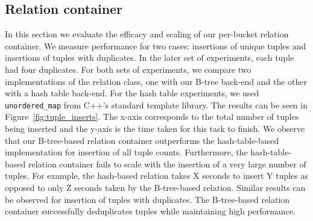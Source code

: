 

\subsection{Relation container}
\label{sec:relation}

In this section we evaluate the efficacy and scaling of our per-bucket relation container. We measure performance for two cases: insertions of unique tuples and insertions of tuples with duplicates. In the later set of experiments, each tuple had four duplicates. For both sets of experiments, we compare two implementations of the relation class, one with our B-tree back-end and the other with a hash table back-end. For the hash table experiments, we used \texttt{unordered\_map} from C++'s standard template library. The results can be seen in Figure~\ref{fig:tuple_inserts}. The x-axis corresponds to the total number of tuples being inserted and the y-axis is the time taken for this task to finish. We observe that our B-tree-based relation container outperforms the hash-table-based implementation for insertion of all tuple counts. Furthermore, the hash-table-based relation container fails to scale with the insertion of a very large number of tuples. For example, the hash-based relation takes X seconds to insert Y tuples as opposed to only Z seconds taken by the B-tree-based relation. Similar results can be observed for insertion of tuples with duplicates. The B-tree-based relation container successfully deduplicates tuples while maintaining high performance.



